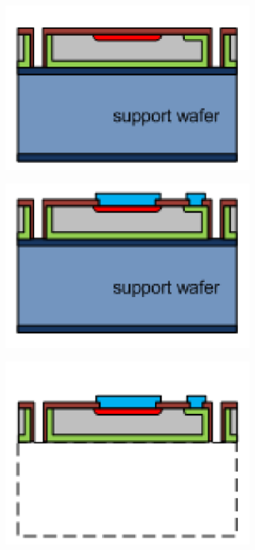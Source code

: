 \begin{figure}[htbp]
  \begin{subfigure}[b]{0.3\textwidth}
    \centering
    \includegraphics[width=\textwidth]{figures/ActiveEdge/advacamProcess/wafer_7}
    \caption{}
  \end{subfigure}\hfill
  \begin{subfigure}[b]{0.3\textwidth}
    \includegraphics[width=\textwidth]{figures/ActiveEdge/advacamProcess/wafer_8}
    \caption{}
  \end{subfigure}\hfill
  \begin{subfigure}[b]{0.3\textwidth}
    \includegraphics[width=\textwidth]{figures/ActiveEdge/advacamProcess/wafer_9}

\end{subfigure}
\end{figure}
